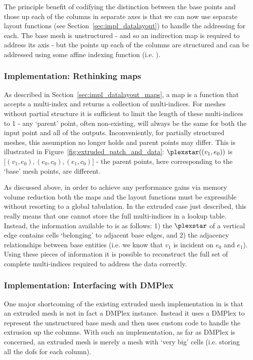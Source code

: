 The principle benefit of codifying the distinction between the base points and those up each of the columns in separate axes is that we can now use separate layout functions (see Section~\ref{sec:impl_datalayout}) to handle the addressing for each.
The base mesh is unstructured - and so an indirection map is required to address its axis - but the points up each of the columns are structured and can be addressed using some affine indexing function (i.e. ).

\subsubsection{Implementation: Rethinking maps}
\label{sec:future_partialstructure_maps}

As described in Section~\ref{sec:impl_datalayout_maps}, a map is a function that accepts a multi-index and returns a collection of multi-indices.
For meshes without partial structure it is sufficient to limit the length of these multi-indices to 1 - any `parent' point, often non-existing, will always be the same for both the input point and all of the outputs.
Inconveniently, for partially structured meshes, this assumption no longer holds and parent points may differ.
This is illustrated in Figure~\ref{fig:extruded_patch_and_data}: $\plexstar((v_1,e_0))$ is $\big[ (v_1,e_0), (e_0,c_0), (e_1,c_0) \big]$ - the parent points, here corresponding to the `base' mesh points, are different.

As discussed above, in order to achieve any performance gains via memory volume reduction both the maps and the layout functions must be expressible without resorting to a global tabulation.
In the extruded case just described, this really means that one cannot store the full multi-indices in a lookup table.
Instead, the information available to  is as follows:
1) the $\plexstar$ of a vertical edge contains cells `belonging' to adjacent base edges, and
2) the adjacency relationships between base entities (i.e. we know that $v_1$ is incident on $e_0$ and $e_1$).
Using these pieces of information it is possible to reconstruct the full set of complete multi-indices required to address the data correctly.

\subsubsection{Implementation: Interfacing with DMPlex}

One major shortcoming of the existing extruded mesh implementation in  is that an extruded mesh is not in fact a DMPlex instance.
Instead it uses a DMPlex to represent the unstructured base mesh and then uses custom code to handle the extrusion up the columns.
With such an implementation, as far as DMPlex is concerned, an extruded mesh is merely a mesh with `very big' cells (i.e. storing all the \glspl{dof} for each column).

